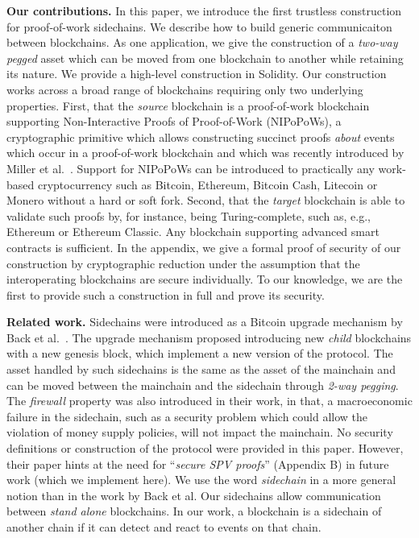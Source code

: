 \noindent\textbf{Our contributions. } In this paper, we introduce the first
trustless construction for proof-of-work sidechains. We describe how to build
generic communicaiton between blockchains. As one application, we give the
construction of a \emph{two-way pegged} asset which can be moved from one
blockchain to another while retaining its nature. We provide a high-level
construction in Solidity. Our construction works across a broad range of
blockchains requiring only two underlying properties. First, that the
\emph{source} blockchain is a proof-of-work blockchain supporting
Non-Interactive Proofs of Proof-of-Work (NIPoPoWs), a cryptographic primitive
which allows constructing succinct proofs \emph{about} events which occur in a
proof-of-work blockchain and which was recently introduced by Miller et
al.~\cite{nipopows}. Support for NIPoPoWs can be introduced to practically any
work-based cryptocurrency such as Bitcoin, Ethereum, Bitcoin Cash, Litecoin or
Monero without a hard or soft fork. Second, that the \emph{target} blockchain is
able to validate such proofs by, for instance, being Turing-complete, such as,
e.g., Ethereum or Ethereum Classic. Any blockchain supporting advanced smart
contracts is sufficient. In the appendix, we give a formal proof of security of
our construction by cryptographic reduction under the assumption that the
interoperating blockchains are secure individually. To our knowledge, we are the
first to provide such a construction in full and prove its security.

\noindent\textbf{Related work. }
Sidechains were introduced as a Bitcoin upgrade mechanism by Back et
al.~\cite{sidechains}. The upgrade mechanism proposed introducing new
\emph{child} blockchains with a new genesis block, which implement a new version
of the protocol. The asset handled by such sidechains is the same as the asset
of the mainchain and can be moved between the mainchain and the sidechain
through \emph{2-way pegging}. The \emph{firewall} property was also introduced
in their work, in that, a macroeconomic failure in the sidechain, such as a
security problem which could allow the violation of money supply policies, will
not impact the mainchain. No security definitions or construction of the
protocol were provided in this paper. However, their paper hints at the need for
``\emph{secure SPV proofs}'' (Appendix B) in future work (which we implement
here). We use the word \emph{sidechain} in a more general notion than in the
work by Back et al. Our sidechains allow communication between \emph{stand
alone} blockchains. In our work, a blockchain is a sidechain of another chain if
it can detect and react to events on that chain.

